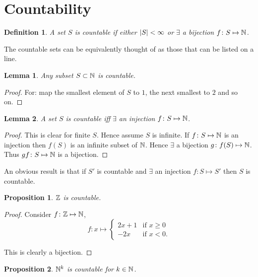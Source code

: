 \documentclass{notes}
\theoremstyle{plain}
\newtheorem*{definition}{Definition}
\newtheorem{lemma}{Lemma}[chapter]
\newtheorem*{proposition}{Proposition}
\begin{document}
\section{Countability}

\begin{definition}
A set $S$ is countable if either $\left|S\right| < \infty$ or $\exists$ a bijection
$f \colon S \mapsto \mathbb{N}$.
\end{definition}

The countable sets can be equivalently thought of as those that can be listed
on a line.

\begin{lemma}
Any subset $S \subset \mathbb{N}$ is countable.
\end{lemma}

\begin{proof}
For: map the smallest element of $S$ to $1$, the next smallest to $2$
and so on.
\end{proof}

\begin{lemma}
A set $S$ is countable iff $\exists$ an injection $f \colon S \mapsto \mathbb{N}$.
\end{lemma}

\begin{proof}
This is clear for finite $S$.  Hence assume $S$ is infinite.  If $f \colon
S \mapsto \mathbb{N}$ is an injection then $f(S)$ is an infinite subset of $\mathbb{N}$.
Hence $\exists$ a bijection $g \colon f(S) \mapsto \mathbb{N}$. Thus
$gf \colon S \mapsto \mathbb{N}$ is a bijection.
\end{proof}

An obvious result is that if $S'$ is countable and $\exists$ an injection
$f \colon S \mapsto S'$ then $S$ is countable.

\begin{proposition}
$\mathbb{Z}$ is countable.
\end{proposition}

\begin{proof}
Consider $f \colon \mathbb{Z} \mapsto \mathbb{N}$,
\[
f \colon x \mapsto \begin{cases}
2 x + 1 & \text{if $x \ge  0$} \\
- 2 x & \text{if $x < 0$.} 
\end{cases}
\]

This is clearly a bijection.
\end{proof}

\begin{proposition}
$\mathbb{N}^k$ is countable for $k \in \mathbb{N}$.
\end{proposition}
\end{document}
